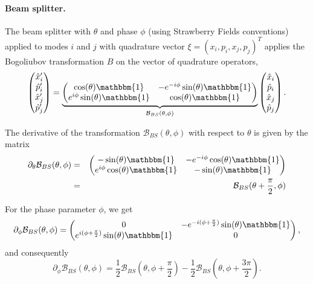 \documentclass[aps,pra,10pt,twocolumn,groupedaddress,nofootinbib]{revtex4-1}
\theoremstyle{plain}
\newcommand{\x}{\hat{x}}
\newcommand{\p}{\hat{p}}
\begin{document}
\paragraph{Beam splitter.}
The beam splitter with $\theta$ and phase $\phi$ (using Strawberry Fields conventions) applied to modes $i$ and $j$ with quadrature vector $\xi = (x_i, p_i, x_j, p_j )^T$ applies the Bogoliubov transformation $B$ on the vector of quadrature operators,
\begin{equation} \label{eq:beamsplitter_as_matrix} \begin{pmatrix} \x'_i \\ \p'_i \\ \x'_j \\ \p'_j \end{pmatrix} =
\underbrace{\begin{pmatrix} \cos(\theta) \mathbbm{1} & -e^{-i\phi}\sin(\theta) \mathbbm{1}\\
e^{i\phi}\sin(\theta) \mathbbm{1} & \cos(\theta) \mathbbm{1} \end{pmatrix}}_{\mathcal{B}_{BS}(\theta, \phi)} \begin{pmatrix} \x_i \\ \p_i \\ \x_j \\ \p_j \end{pmatrix}.
\end{equation}

The derivative of the transformation $ \mathcal{B}_{BS}(\theta, \phi)$ with respect to $\theta$ is given by the matrix
\begin{eqnarray*}
\partial_{\theta} \mathcal{B}_{BS}(\theta, \phi) &=& \begin{pmatrix} -\sin(\theta) \mathbbm{1} & -e^{-i\phi}\cos(\theta) \mathbbm{1}\\
e^{i\phi}\cos(\theta) \mathbbm{1} & -\sin(\theta) \mathbbm{1} \end{pmatrix} \\
&=& \mathcal{B}_{BS}(\theta +\frac{\pi}{2}, \phi )
\end{eqnarray*}


For the phase parameter $\phi$, we get
\[ \partial_{\phi} \mathcal{B}_{BS}(\theta, \phi) = \begin{pmatrix} 0 & - e^{-i(\phi + \frac{\pi}{2})} \sin(\theta) \mathbbm{1}\\
e^{i(\phi + \frac{\pi}{2})}\sin(\theta) \mathbbm{1} & 0  \end{pmatrix}, \]
and consequently
\[\partial_{\phi} \mathcal{B}_{BS}(\theta, \phi) = \frac{1}{2}\mathcal{B}_{BS}(\theta, \phi + \frac{\pi}{2}) - \frac{1}{2}\mathcal{B}_{BS}(\theta, \phi + \frac{3\pi}{2}). \]
\end{document}
